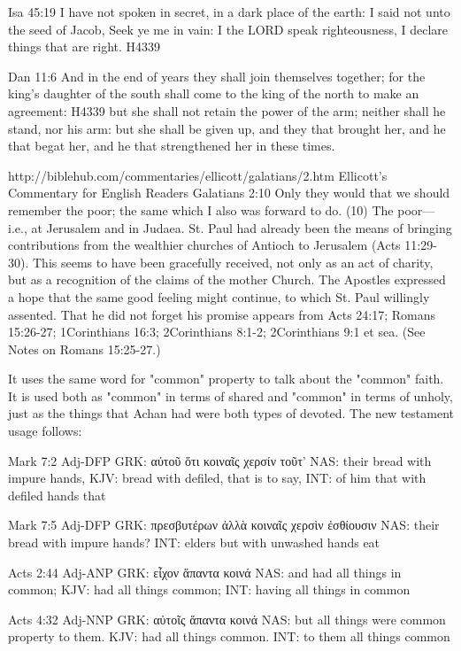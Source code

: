 \documentclass[11pt]{article}
\begin{document}
\begin{thebibliography}{37}
Isa 45:19
I have not spoken in secret, in a dark place of the earth: I said not unto the seed of Jacob, Seek ye me in vain: I the LORD speak righteousness, I declare things that are right. H4339

Dan 11:6
And in the end of years they shall join themselves together; for the king's daughter of the south shall come to the king of the north to make an agreement: H4339 but she shall not retain the power of the arm; neither shall he stand, nor his arm: but she shall be given up, and they that brought her, and he that begat her, and he that strengthened her in these times.


http://biblehub.com/commentaries/ellicott/galatians/2.htm
Ellicott's Commentary for English Readers
Galatians 2:10
Only they would that we should remember the poor; the same which I also was forward to do.
(10) The poor—i.e., at Jerusalem and in Judaea. St. Paul had already been the means of bringing contributions from the wealthier churches of Antioch to Jerusalem (Acts 11:29-30). This seems to have been gracefully received, not only as an act of charity, but as a recognition of the claims of the mother Church. The Apostles expressed a hope that the same good feeling might continue, to which St. Paul willingly assented. That he did not forget his promise appears from Acts 24:17; Romans 15:26-27; 1Corinthians 16:3; 2Corinthians 8:1-2; 2Corinthians 9:1 et sea. (See Notes on Romans 15:25-27.)


It uses the same word for "common" property to talk about the "common" faith. It is used both as "common" in terms of shared and "common" in terms of unholy, just as the things that Achan had were both types of devoted. The new testament usage follows:

\begin{greek}
Mark 7:2 Adj-DFP
GRK: αὐτοῦ ὅτι κοιναῖς χερσίν τοῦτ'
NAS: their bread with impure hands,
KJV: bread with defiled, that is to say,
INT: of him that with defiled hands that

Mark 7:5 Adj-DFP
GRK: πρεσβυτέρων ἀλλὰ κοιναῖς χερσὶν ἐσθίουσιν
NAS: their bread with impure hands?
INT: elders but with unwashed hands eat

Acts 2:44 Adj-ANP
GRK: εἶχον ἅπαντα κοινά 
NAS: and had all things in common;
KJV: had all things common;
INT: having all things in common

Acts 4:32 Adj-NNP
GRK: αὐτοῖς ἅπαντα κοινά 
NAS: but all things were common property to them.
KJV: had all things common.
INT: to them all things common


\end{greek}
\end{thebibliography}
\end{document}
